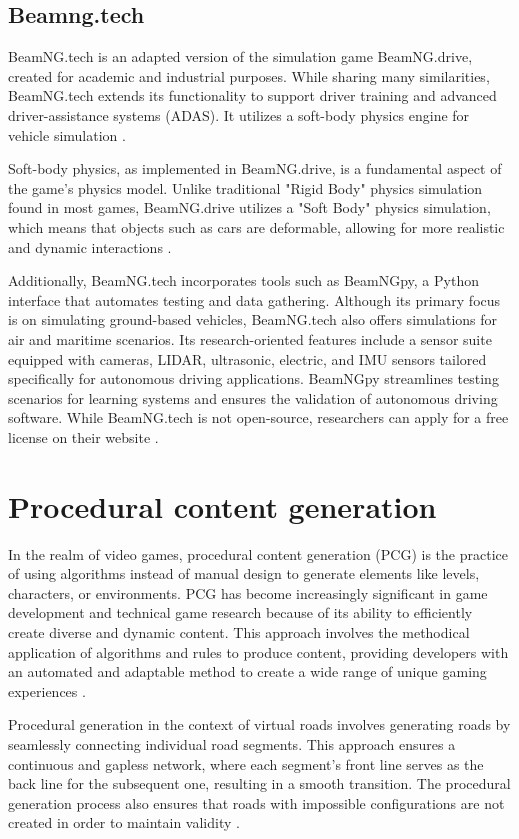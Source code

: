 \subsection{Beamng.tech}
BeamNG.tech is an adapted version of the simulation game BeamNG.drive, created for academic and industrial purposes. While sharing many similarities, BeamNG.tech extends its functionality to support driver training and advanced driver-assistance systems (ADAS). It utilizes a soft-body physics engine for vehicle simulation \cite{BeamNG}.

Soft-body physics, as implemented in BeamNG.drive, is a fundamental aspect of the game's physics model. Unlike traditional "Rigid Body" physics simulation found in most games, BeamNG.drive utilizes a "Soft Body" physics simulation, which means that objects such as cars are deformable, allowing for more realistic and dynamic interactions \cite{BeamNGphysics}.

Additionally, BeamNG.tech incorporates tools such as BeamNGpy, a Python interface that automates testing and data gathering. Although its primary focus is on simulating ground-based vehicles, BeamNG.tech also offers simulations for air and maritime scenarios. Its research-oriented features include a sensor suite equipped with cameras, LIDAR, ultrasonic, electric, and IMU sensors tailored specifically for autonomous driving applications. BeamNGpy streamlines testing scenarios for learning systems and ensures the validation of autonomous driving software. While BeamNG.tech is not open-source, researchers can apply for a free license on their website \cite{BeamNG}.

\section{Procedural content generation}
In the realm of video games, procedural content generation (PCG) is the practice of using algorithms instead of manual design to generate elements like levels, characters, or environments. PCG has become increasingly significant in game development and technical game research because of its ability to efficiently create diverse and dynamic content. This approach involves the methodical application of algorithms and rules to produce content, providing developers with an automated and adaptable method to create a wide range of unique gaming experiences \cite{GambiMMFG}\cite{SummervilleSGHHINT}.

Procedural generation in the context of virtual roads involves generating roads by seamlessly connecting individual road segments. This approach ensures a continuous and gapless network, where each segment's front line serves as the back line for the subsequent one, resulting in a smooth transition. The procedural generation process also ensures that roads with impossible configurations are not created in order to maintain validity \cite{GambiMF}\cite{GambiMMFG}. 

